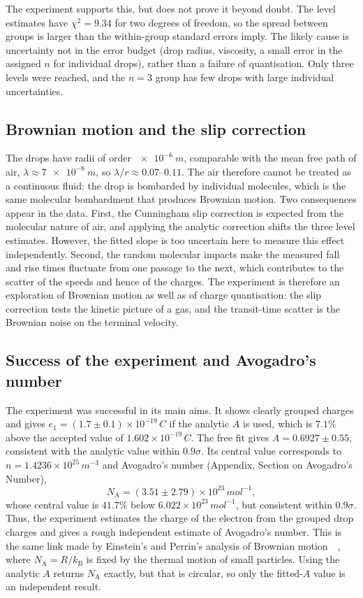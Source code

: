 \documentclass[12pt,a4paper]{article}
\begin{document}
The experiment supports this, but does not prove it beyond doubt. The level
estimates have $\chi^2=9.34$ for two degrees of freedom, so the spread
between groups is larger than the within-group standard errors imply. The
likely cause is uncertainty not in the error budget (drop radius, viscosity,
a small error in the assigned $n$ for individual drops), rather than a failure
of quantisation. Only three levels were reached, and the $n=3$ group has
few drops with large individual uncertainties.

\subsection{Brownian motion and the slip correction}
The drops have radii of order $\SI{e-6}{m}$, comparable with the mean free
path of air, $\lambda\approx\SI{7e-8}{m}$, so $\lambda/r\approx0.07$--$0.11$.
The air therefore cannot be treated as a continuous fluid: the drop is
bombarded by individual molecules, which is the same molecular bombardment
that produces Brownian motion. Two consequences appear in the data.
First, the Cunningham slip correction is expected from the molecular nature
of air, and applying the analytic correction shifts the three level estimates.
However, the fitted slope is too uncertain here to measure this effect
independently. Second, the random molecular impacts
make the measured fall and rise times fluctuate from one passage to the next,
which contributes to the scatter of the speeds and hence of the charges. The
experiment is therefore an exploration of Brownian motion as well as of
charge quantisation: the slip correction tests the kinetic picture of a gas,
and the transit-time scatter is the Brownian noise on the terminal velocity.

\subsection{Success of the experiment and Avogadro's number}
The experiment was successful in its main aims. It shows clearly grouped
charges and gives $e_1=(1.7\pm0.1)\times10^{-19}\,\si{C}$ if the
analytic $A$ is used, which is $7.1\%$ above the accepted value of
$1.602\times10^{-19}\,\si{C}$. The free fit gives
$A=0.6927\pm0.55$, consistent with the analytic value within $0.9\sigma$.
Its central value corresponds to $n=1.4236\times10^{25}\,\si{m^{-3}}$ and
Avogadro's number
(Appendix, Section on Avogadro's Number),
\[
N_{\mathrm{A}}=(3.51\pm2.79)\times10^{23}\,\si{mol^{-1}},
\]
whose central value is $41.7\%$ below $6.022\times10^{23}\,\si{mol^{-1}}$,
but consistent within $0.9\sigma$. Thus, the experiment estimates the charge
of the electron from the grouped drop charges and gives a rough independent
estimate of Avogadro's number. This is the same link made by Einstein's and
Perrin's analysis of Brownian motion~\cite{Einstein1905}~\cite{Perrin1914},
where $N_{\mathrm{A}}=R/k_{\mathrm{B}}$ is fixed by the thermal motion of
small particles. Using the analytic $A$ returns $N_{\mathrm{A}}$ exactly, but
that is circular, so only the fitted-$A$ value is an independent result.
\end{document}
